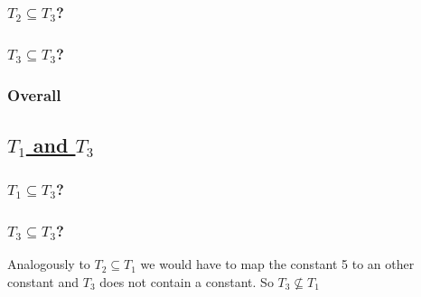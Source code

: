 \documentclass[12pt]{article}
\begin{document}
	\subsubsection*{$T_2 \subseteq T_3$?} %
	
	\subsubsection*{$T_3 \subseteq T_3$?} %
%	
	\subsubsection*{Overall} %
	
	\subsection*{\underline{$T_1$ and $T_3$}}
	\subsubsection*{$T_1 \subseteq T_3$?}
	\subsubsection*{$T_3 \subseteq T_3$?}
	Analogously to $T_2 \subseteq T_1$ we would have to map the constant 5 to an other constant and $T_3$ does not contain a constant. So $T_3 \not \subseteq T_1$
\end{document}
